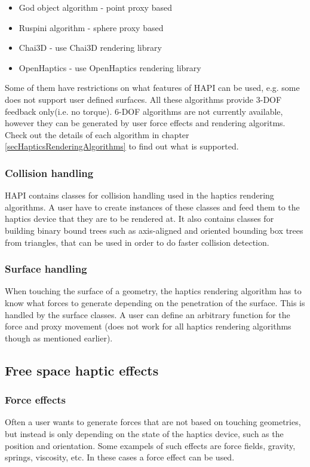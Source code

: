 \begin{itemize}
\item God object algorithm - point proxy based
\item Ruspini algorithm - sphere proxy based
\item Chai3D - use Chai3D rendering library
\item OpenHaptics - use OpenHaptics rendering library
\end{itemize}

Some of them have restrictions on what features of HAPI can be used, e.g. some does not support user defined surfaces. All these algorithms provide 3-DOF feedback only(i.e. no torque). 6-DOF algorithms are not currently available, however they can be generated by user force effects and rendering algoritms. Check out the details of each algorithm in chapter \ref{secHapticsRenderingAlgorithms} to find out what is supported.

\subsubsection{Collision handling}
HAPI contains classes for collision handling used in the
haptics rendering algorithms. A user have to create instances of these
classes and feed them to the haptics device that they are to be
rendered at. It also contains classes for building binary bound trees
such as axis-aligned and oriented bounding box trees from triangles,
that can be used in order to do faster collision detection. 

\subsubsection{Surface handling}
When touching the surface of a geometry, the haptics rendering
algorithm has to know what forces to generate depending on the
penetration of the surface. This is handled by the surface classes. A
user can define an arbitrary function for the force and proxy
movement (does not work for all haptics rendering algorithms though as
mentioned earlier).

\subsection{Free space haptic effects}

\subsubsection{Force effects}
Often a user wants to generate forces that are not based on
touching geometries, but instead is only depending on the state of the haptics device, such as the position and orientation. Some exampels of such effects are force fields, gravity, springs, viscosity, etc. In these cases a force effect can be used.


